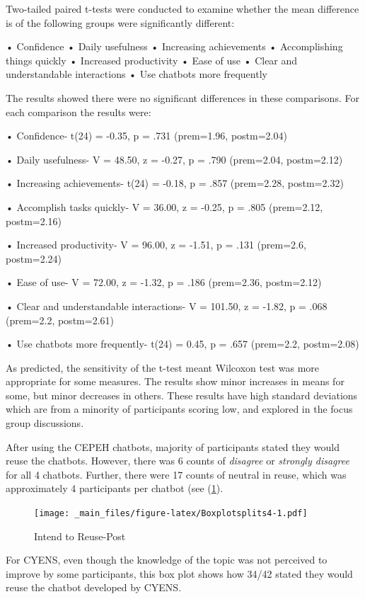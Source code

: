 \documentclass[a4paper, nobind]{templates/ociamthesis}
\begin{document}
Two-tailed paired t-tests were conducted to examine whether the mean difference is of the following groups were significantly different:

• Confidence
• Daily usefulness
• Increasing achievements
• Accomplishing things quickly
• Increased productivity
• Ease of use
• Clear and understandable interactions
• Use chatbots more frequently

The results showed there were no significant differences in these comparisons. For each comparison the results were:

• Confidence- t(24) = -0.35, p = .731 (prem=1.96, postm=2.04)

• Daily usefulness- V = 48.50, z = -0.27, p = .790 (prem=2.04, postm=2.12)

• Increasing achievements- t(24) = -0.18, p = .857 (prem=2.28, postm=2.32)

• Accomplish tasks quickly- V = 36.00, z = -0.25, p = .805 (prem=2.12, postm=2.16)

• Increased productivity- V = 96.00, z = -1.51, p = .131 (prem=2.6, postm=2.24)

• Ease of use- V = 72.00, z = -1.32, p = .186 (prem=2.36, postm=2.12)

• Clear and understandable interactions- V = 101.50, z = -1.82, p = .068 (prem=2.2, postm=2.61)

• Use chatbots more frequently- t(24) = 0.45, p = .657 (prem=2.2, postm=2.08)

As predicted, the sensitivity of the t-test meant Wilcoxon test was more appropriate for some measures. The results show minor increases in means for some, but minor decreases in others. These results have high standard deviations which are from a minority of participants scoring low, and explored in the focus group discussions.

After using the CEPEH chatbots, majority of participants stated they
would reuse the chatbots. However, there was 6 counts of \emph{disagree} or
\emph{strongly disagree} for all 4 chatbots. Further, there were 17 counts of
neutral in reuse, which was approximately 4 participants per chatbot
(see (\ref{fig:Boxplotsplits4}).

\begin{figure}
\centering
\texttt{[image: \_main\_files/figure-latex/Boxplotsplits4-1.pdf]}
\caption{\label{fig:Boxplotsplits4}Intend to Reuse-Post}
\end{figure}

For CYENS, even though the knowledge of the topic was not perceived to
improve by some participants, this box plot shows how 34/42 stated they
would reuse the chatbot developed by CYENS.
\end{document}

